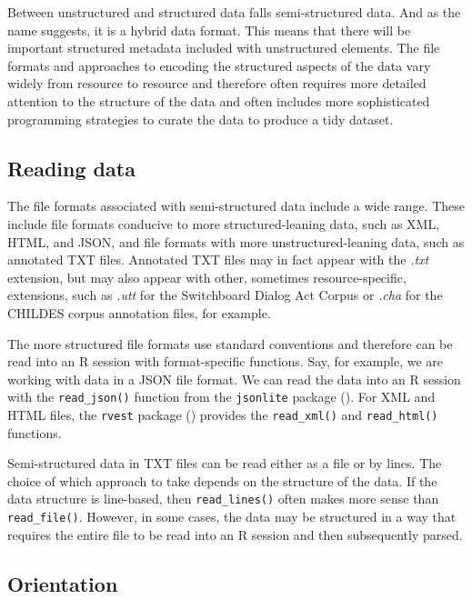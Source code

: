 \documentclass[
  letterpaper,
]{latex/krantz}
\theoremstyle{definition}
\theoremstyle{remark}
\begin{document}
Between unstructured and structured data falls semi-structured data. And
as the name suggests, it is a hybrid data format. This means that there
will be important structured metadata included with unstructured
elements. The file formats and approaches to encoding the structured
aspects of the data vary widely from resource to resource and therefore
often requires more detailed attention to the structure of the data and
often includes more sophisticated programming strategies to curate the
data to produce a tidy dataset.

\subsection{Reading data}\label{reading-data-1}

The file formats associated with semi-structured data include a wide
range. These include file formats conducive to more structured-leaning
data, such as XML, HTML, and JSON, and file formats with more
unstructured-leaning data, such as annotated TXT files. Annotated TXT
files may in fact appear with the \emph{.txt} extension, but may also
appear with other, sometimes resource-specific, extensions, such as
\emph{.utt} for the Switchboard Dialog Act Corpus or \emph{.cha} for the
CHILDES corpus annotation files, for example.

The more structured file formats use standard conventions and therefore
can be read into an R session with format-specific functions. Say, for
example, we are working with data in a JSON file format. We can read the
data into an R session with the \texttt{read\_json()} function from the
\texttt{jsonlite} package (). For
XML and HTML files, the \texttt{rvest} package
() provides the \texttt{read\_xml()}
and \texttt{read\_html()} functions.

Semi-structured data in TXT files can be read either as a file or by
lines. The choice of which approach to take depends on the structure of
the data. If the data structure is line-based, then
\texttt{read\_lines()} often makes more sense than
\texttt{read\_file()}. However, in some cases, the data may be
structured in a way that requires the entire file to be read into an R
session and then subsequently parsed.

\subsection{Orientation}\label{sec-cd-semi-structured-orientation}
\end{document}

